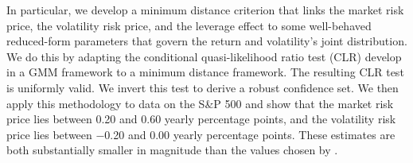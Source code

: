 \documentclass[11pt, letterpaper, twoside]{article}
\begin{document}
In particular, we develop a minimum distance criterion that links the market risk price, the volatility risk price, and the leverage effect to some well-behaved reduced-form parameters that govern the return and volatility's joint distribution. We do this by adapting the conditional quasi-likelihood ratio test (CLR) \textcite{andrews2016conditional} develop in a GMM framework to a minimum distance framework. The resulting CLR test is uniformly valid. We invert this test to derive a robust confidence set. We then apply this methodology to data on the S\&P 500 and show that the market risk price lies between \num{0.20} and \num{0.60} yearly percentage points, and the volatility risk price lies between \num{-0.20} and \num{0.00} yearly percentage points. These estimates are both substantially smaller in magnitude than the values chosen by \textcite{han2018leverage}.


\clearpage

\printbibliography
\end{document}
